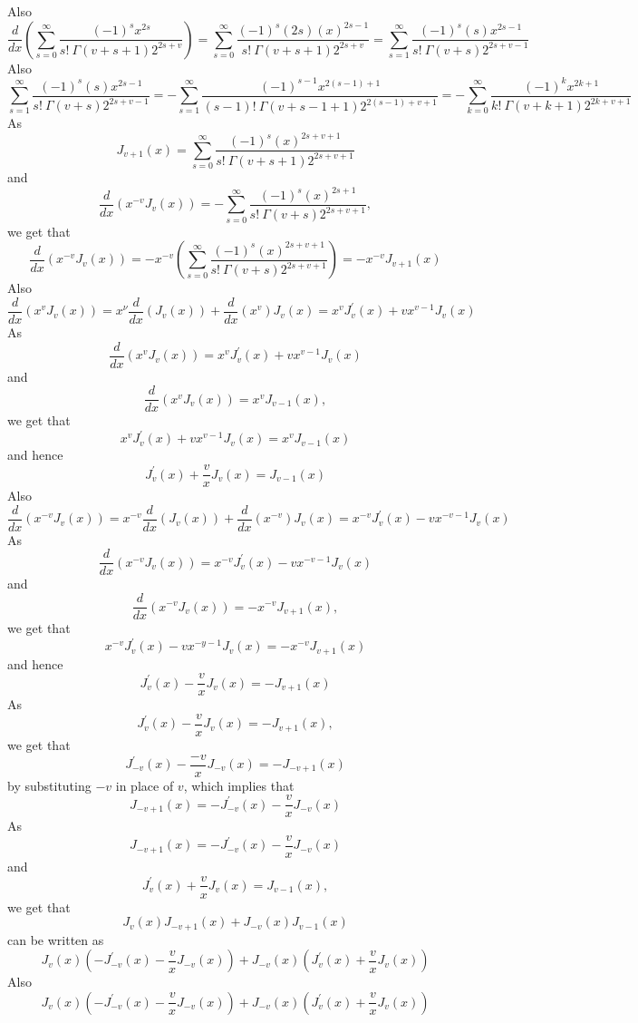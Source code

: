 Also 
$$\frac{d}{d x}\left(\sum_{s=0}^{\infty} \frac{(-1)^{s} x^{2 s}}{s ! \  \Gamma(v+s+1) 2^{2 s+v}}\right)=\sum_{s=0}^{\infty} \frac{(-1)^{s}(2 s)(x)^{2 s-1}}{s ! \  \Gamma(v+s+1) 2^{2 s+v}}=\sum_{s=1}^{\infty} \frac{(-1)^{s}(s) x^{2 s-1}}{s ! \  \Gamma(v+s) 2^{2 s+v-1}}$$
Also 
$$\sum_{s=1}^{\infty} \frac{(-1)^{s}(s) x^{2 s-1}}{s ! \  \Gamma(v+s) 2^{2 s+v-1}}=-\sum_{s=1}^{\infty} \frac{(-1)^{s-1} x^{2(s-1)+1}}{(s-1) ! \  \Gamma(v+s-1+1) 2^{2(s-1)+v+1}}=-\sum_{k=0}^{\infty} \frac{(-1)^{k} x^{2 k+1}}{k ! \  \Gamma(v+k+1) 2^{2 k+v+1}}$$
As 
$$J_{v+1}(x)=\sum_{s=0}^{\infty} \frac{(-1)^{s}(x)^{2 s+v+1}}{s ! \  \Gamma(v+s+1) 2^{2 s+v+1}}$$ 
and 
$$\frac{d}{d x}\left(x^{-v} J_{v}(x)\right)=-\sum_{s=0}^{\infty} \frac{(-1)^{s}(x)^{2 s+1}}{s ! \  \Gamma(v+s) 2^{2 s+v+1}},$$ 
we get that
$$\frac{d}{d x}\left(x^{-v} J_{v}(x)\right)=-x^{-v}\left(\sum_{s=0}^{\infty} \frac{(-1)^{s}(x)^{2 s+v+1}}{s ! \  \Gamma(v+s) 2^{2 s+v+1}}\right)=-x^{-v} J_{v+1}(x)$$
Also 
$$\frac{d}{d x}\left(x^{v} J_{v}(x)\right)=x^{\nu} \frac{d}{d x}\left(J_{v}(x)\right)+\frac{d}{d x}\left(x^{v}\right) J_{v}(x)=x^{v} J_{v}^{\prime}(x)+v x^{v-1} J_{v}(x)$$
As 
$$\frac{d}{d x}\left(x^{v} J_{v}(x)\right)=x^{v} J_{v}^{\prime}(x)+v x^{v-1} J_{v}(x)$$ 
and 
$$\frac{d}{d x}\left(x^{v} J_{v}(x)\right)=x^{v} J_{v-1}(x),$$
we get that
$$x^{v} J_{v}^{\prime}(x)+v x^{v-1} J_{v}(x)=x^{v} J_{v-1}(x)$$ 
and hence 
$$J_{v}^{\prime}(x)+\frac{v}{x} J_{v}(x)=J_{v-1}(x)$$
Also 
$$\frac{d}{d x}\left(x^{-v} J_{v}(x)\right)=x^{-v} \frac{d}{d x}\left(J_{v}(x)\right)+\frac{d}{d x}\left(x^{-v}\right) J_{v}(x)=x^{-v} J_{v}^{\prime}(x)-v x^{-v-1} J_{v}(x)$$
As 
$$\frac{d}{d x}\left(x^{-v} J_{v}(x)\right)=x^{-v} J_{v}^{\prime}(x)-v x^{-v-1} J_{v}(x)$$ 
and 
$$\frac{d}{d x}\left(x^{-v} J_{v}(x)\right)=-x^{-v} J_{v+1}(x),$$ 
we get that
$$x^{-v} J_{v}^{\prime}(x)-v x^{-y-1} J_{v}(x)=-x^{-v} J_{v+1}(x)$$ 
and hence 
$$J_{v}^{\prime}(x)-\frac{v}{x} J_{v}(x)=-J_{v+1}(x)$$
As 
$$J_{v}^{\prime}(x)-\frac{v}{x} J_{v}(x)=-J_{v+1}(x),$$ 
we get that 
$$J_{-v}^{\prime}(x)-\frac{-v}{x} J_{-v}(x)=-J_{-v+1}(x)$$
by substituting
$-v$ in place of $v$, which implies that 
$$J_{-v+1}(x)=-J_{-v}^{\prime}(x)-\frac{v}{x} J_{-v}(x)$$
As 
$$J_{-v+1}(x)=-J_{-v}^{\prime}(x)-\frac{v}{x} J_{-v}(x)$$ 
and 
$$J_{v}^{\prime}(x)+\frac{v}{x} J_{v}(x)=J_{v-1}(x),$$
we get that
$$J_{v}(x) J_{-v+1}(x)+J_{-v}(x) J_{v-1}(x)$$ 
can be written as
$$J_{v}(x)\left(-J_{-v}^{\prime}(x)-\frac{v}{x} J_{-v}(x)\right)+J_{-v}(x)\left(J_{v}^{\prime}(x)+\frac{v}{x} J_{v}(x)\right)$$
Also 
$$J_{v}(x)\left(-J_{-v}^{\prime}(x)-\frac{v}{x} J_{-v}(x)\right)+J_{-v}(x)\left(J_{v}^{\prime}(x)+\frac{v}{x} J_{v}(x)\right)$$ 
